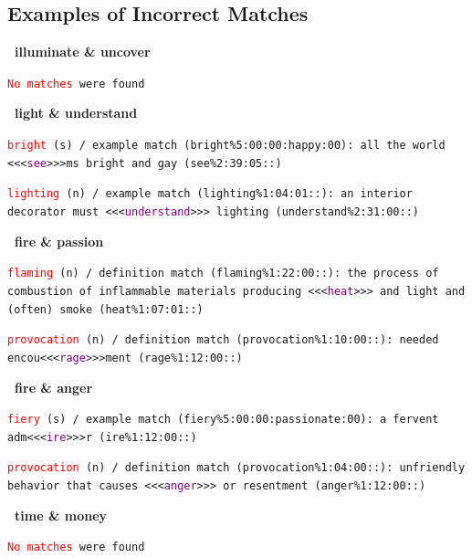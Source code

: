\documentclass[12pt,a4paper]{article}
\begin{document}
\subsection*{Examples of Incorrect Matches}
{\small

\noindent\textbf{\textbullet\ illuminate \& uncover}

\texttt{\textcolor{red}{No matches} were found}

\vspace{1em}

\noindent\textbf{\textbullet\ light \& understand}

\texttt{\textcolor{red}{bright} (s) / example match (bright\%5:00:00:happy:00): all the world <<<\textcolor{purple}{see}>>>ms bright and gay (see\%2:39:05::)}

\texttt{\textcolor{red}{lighting} (n) / example match (lighting\%1:04:01::): an interior decorator must <<<\textcolor{purple}{understand}>>> lighting (understand\%2:31:00::)}

\vspace{1em}

\noindent\textbf{\textbullet\ fire \& passion}

\texttt{\textcolor{red}{flaming} (n) / definition match (flaming\%1:22:00::): the process of combustion of inflammable materials producing <<<\textcolor{purple}{heat}>>> and light and (often) smoke (heat\%1:07:01::)}

\texttt{\textcolor{red}{provocation} (n) / definition match (provocation\%1:10:00::): needed encou<<<\textcolor{purple}{rage}>>>ment (rage\%1:12:00::)}

\vspace{1em}

\noindent\textbf{\textbullet\ fire \& anger}

\texttt{\textcolor{red}{fiery} (s) / example match (fiery\%5:00:00:passionate:00): a fervent adm<<<\textcolor{purple}{ire}>>>r (ire\%1:12:00::)}

\texttt{\textcolor{red}{provocation} (n) / definition match (provocation\%1:04:00::): unfriendly behavior that causes <<<\textcolor{purple}{anger}>>> or resentment (anger\%1:12:00::)}

\vspace{1em}

\noindent\textbf{\textbullet\ time \& money}

\texttt{\textcolor{red}{No matches} were found}

\vspace{1em}

}
\end{document}
